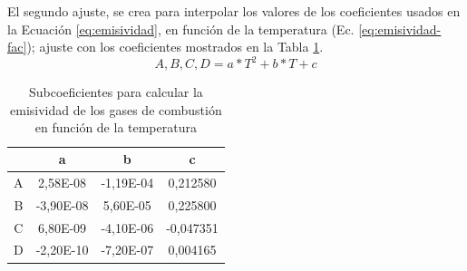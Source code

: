\par El segundo ajuste, se crea para interpolar los valores de los coeficientes usados en la Ecuación \ref{eq:emisividad}, en función de la temperatura (Ec. \ref{eq:emisividad-fac}); ajuste con los coeficientes mostrados en la Tabla \ref{tbl:emisividad-fac}.
\begin{equation}
\label{eq:emisividad-fac}
A, B, C, D = a*T^2+b*T+c
\end{equation}
\begin{table}[H]
\caption{Subcoeficientes para calcular la emisividad de los gases de combustión en función de la temperatura}
\label{tbl:emisividad-fac}
\centering
\begin{tabular}{c|c|c|c}		
	& a         & b	        & c \\
	\hline
A	&  2,58E-08	& -1,19E-04	& 0,212580 \\
B	& -3,90E-08	&  5,60E-05	& 0,225800 \\
C	&  6,80E-09	& -4,10E-06	&-0,047351 \\
D	& -2,20E-10	& -7,20E-07	& 0,004165 \\
\end{tabular}
\end{table}

